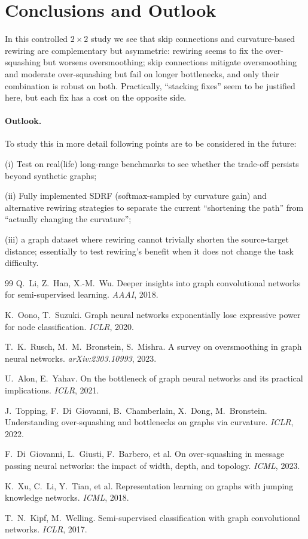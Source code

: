 \documentclass[inlineanswers]{exam2024}
\begin{document}
\section{Conclusions and Outlook}
\label{sec:conclusion}

In this controlled $2\times2$ study we see that skip connections and curvature-based
rewiring are complementary but asymmetric: rewiring seems to fix the
over-squashing but worsens oversmoothing; skip connections mitigate oversmoothing
and moderate over-squashing but fail on longer bottlenecks, and only their
combination is robust on both. Practically, ``stacking fixes'' seem to be justified here, but each fix has a cost on the opposite side.

\paragraph{Outlook.}
To study this in more detail following points are to be considered in the future: 

(i) Test on real(life) long-range benchmarks to see whether the trade-off persists beyond synthetic graphs;

(ii) Fully implemented SDRF (softmax-sampled by curvature gain) and alternative rewiring strategies to separate the current ``shortening the path'' from ``actually changing the curvature'';

(iii) a graph dataset where rewiring cannot trivially shorten the source-target
distance; essentially to test rewiring's benefit when it does not change the task difficulty.

\begin{thebibliography}{99}
\small
{} Q.~Li, Z.~Han, X.-M.~Wu. Deeper insights into graph convolutional networks for semi-supervised learning. \emph{AAAI}, 2018.

 K.~Oono, T.~Suzuki. Graph neural networks exponentially lose
expressive power for node classification. \emph{ICLR}, 2020.

 T.~K.~Rusch, M.~M.~Bronstein, S.~Mishra. A survey on
oversmoothing in graph neural networks. \emph{arXiv:2303.10993}, 2023.

 U.~Alon, E.~Yahav. On the bottleneck of graph neural networks and
its practical implications. \emph{ICLR}, 2021.

 J.~Topping, F.~Di~Giovanni, B.~Chamberlain, X.~Dong,
M.~Bronstein. Understanding over-squashing and bottlenecks on graphs via curvature.
\emph{ICLR}, 2022.

 F.~Di~Giovanni, L.~Giusti, F.~Barbero, et al. On
over-squashing in message passing neural networks: the impact of width, depth, and
topology. \emph{ICML}, 2023.

 K.~Xu, C.~Li, Y.~Tian, et al. Representation learning on graphs
with jumping knowledge networks. \emph{ICML}, 2018.

 T.~N.~Kipf, M.~Welling. Semi-supervised classification with graph
convolutional networks. \emph{ICLR}, 2017.

\end{thebibliography}
\end{document}

